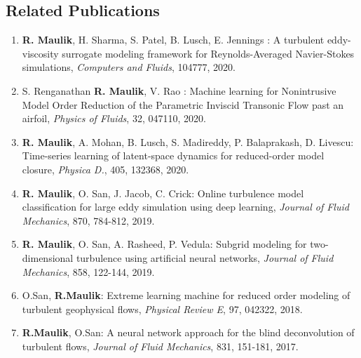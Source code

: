 \documentclass[11pt]{article}
\begin{document}
\subsection*{Related Publications}
\begin{enumerate}
\parskip = -2pt

\item \textbf{R. Maulik}, H. Sharma, S. Patel, B. Lusch, E. Jennings : A turbulent eddy-viscosity surrogate modeling framework for Reynolds-Averaged Navier-Stokes simulations, {\it Computers and Fluids}, 104777, 2020.

\item S. Renganathan \textbf{R. Maulik}, V. Rao : Machine learning for Nonintrusive Model Order Reduction of the Parametric Inviscid Transonic Flow past an airfoil, {\it Physics of Fluids}, 32, 047110, 2020.

\item \textbf{R. Maulik}, A. Mohan, B. Lusch, S. Madireddy, P. Balaprakash, D. Livescu: Time-series learning of latent-space dynamics for reduced-order model closure, {\it Physica D.}, 405, 132368, 2020.

\item \textbf{R. Maulik}, O. San, J. Jacob, C. Crick: Online turbulence model classification for large eddy simulation using deep learning, {\it Journal of Fluid Mechanics}, 870, 784-812, 2019.

\item \textbf{R. Maulik}, O. San, A. Rasheed, P. Vedula: Subgrid modeling for two-dimensional turbulence using artificial neural networks, {\it Journal of Fluid Mechanics}, 858, 122-144, 2019.

\item O.San, \textbf{R.Maulik}: Extreme learning machine for reduced order modeling of turbulent geophysical flows, {\it Physical Review E}, 97, 042322, 2018.

\item \textbf{R.Maulik}, O.San: A neural network approach for the blind deconvolution of turbulent flows, {\it Journal of Fluid Mechanics}, 831, 151-181, 2017.

\end{enumerate}
\end{document}

